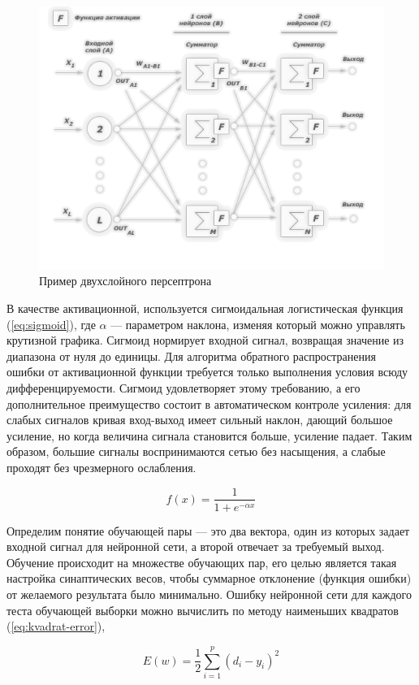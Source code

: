 \documentclass[a4paper,14pt]{extarticle} %
\begin{document}
\begin{figure}[h]
\centering
\includegraphics[width=0.75\linewidth]{NN_multilayer_networks_01}
\caption{Пример двухслойного персептрона}
\label{fig:NN_multilayer_networks_01}
\end{figure}

В качестве активационной, используется сигмоидальная логистическая функция (\ref{eq:sigmoid}), где $\alpha$ --- параметром наклона, изменяя который можно управлять крутизной графика. Сигмоид нормирует входной сигнал, возвращая значение из диапазона от нуля до единицы. Для алгоритма обратного распространения ошибки от активационной функции требуется только выполнения условия всюду дифференцируемости. Сигмоид удовлетворяет этому требованию, а его дополнительное преимущество состоит в автоматическом контроле усиления: для слабых сигналов кривая вход-выход имеет сильный наклон, дающий большое усиление, но когда величина сигнала становится больше, усиление падает. Таким образом, большие сигналы воспринимаются сетью без насыщения, а слабые проходят без чрезмерного ослабления. 

\begin{equation}\label{eq:sigmoid}
f(x)=\frac{1}{1+e^{-\alpha x}}
\end{equation}

Определим понятие обучающей пары --- это два вектора, один из которых задает входной сигнал для нейронной сети, а второй отвечает за требуемый выход. Обучение происходит на множестве обучающих пар, его целью является такая настройка синаптических весов, чтобы суммарное отклонение (функция ошибки) от желаемого результата было минимально. Ошибку нейронной сети для каждого теста обучающей выборки можно вычислить по методу наименьших квадратов (\ref{eq:kvadrat-error}),

\begin{equation}\label{eq:kvadrat-error}
E(w) = \frac{1}{2} \sum\limits_{i=1}^{p} (d_i-y_i)^2
\end{equation}
\end{document}
